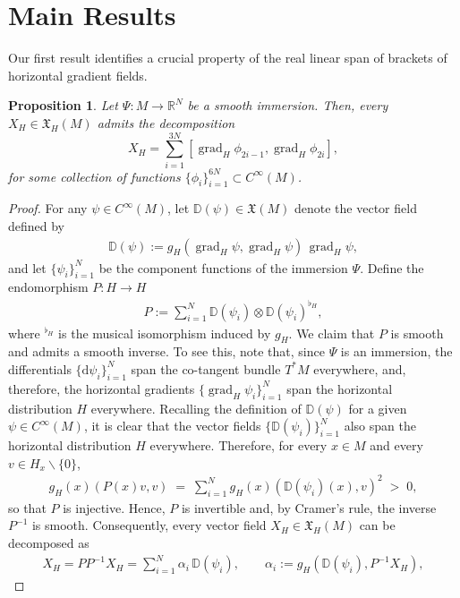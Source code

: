 \documentclass{article}
\newtheorem{proposition}[theorem]{Proposition}
\theoremstyle{remark}
\newcommand{\M}{M}
\newcommand{\Cinf}{C^{\infty}(\M)}
\newcommand{\XH}{\mathfrak{X}_H(\M)}
\DeclareMathOperator{\grad}{\mathrm{grad}}
\begin{document}
\section{Main Results}
%
Our first result identifies a crucial property of the real linear span of brackets of horizontal gradient fields.
%
\begin{proposition}\label{prop:bracket} Let $\Psi:\M\rightarrow\mathbb{R}^{N}$ be a smooth immersion. Then, every $X_H\in \XH$ admits the decomposition
%
$$
X_H = \sum_{i=1}^{3N} [\grad_H\phi_{2i-1}, \grad_H\phi_{2i}],
$$
%
for some collection of functions $\{\phi_i\}_{i=1}^{6N} \subset \Cinf$.
\end{proposition}

\begin{proof}
%
For any $\psi \in \Cinf$, let $\mathbb{D}(\psi)\in\mathfrak{X}(\M)$ denote the vector field defined by
%
\begin{align*}
    \mathbb{D}(\psi) := g_H(\grad_H \psi,\grad_H \psi)\, \grad_H\psi,
\end{align*}
%
and let $\{\psi_i\}_{i=1}^N$ be the component functions of the immersion $\Psi$. Define the endomorphism $P:H\rightarrow H$
%
\begin{align*}
    P:=\sum_{i=1}^{N} \mathbb{D}(\psi_i) \otimes \mathbb{D}(\psi_i)^{\flat_H},
\end{align*}
%
where $^{\flat_H}$ is the musical isomorphism induced by $g_H$. We claim that $P$ is smooth and admits a smooth inverse. To see this, note that, since $\Psi$ is an immersion, the differentials $\{\mathrm{d}\psi_i\}_{i=1}^{N}$ span the co-tangent bundle $T^{*}\M$ everywhere, and, therefore, the horizontal gradients $\{\grad_H\psi_i\}_{i=1}^{N}$ span the horizontal distribution $H$ everywhere. Recalling the definition of $\mathbb{D}(\psi)$ for a given $\psi\in\Cinf$, it is clear that the vector fields $\{\mathbb{D}(\psi_i)\}_{i=1}^{N}$ also span the horizontal distribution $H$ everywhere. Therefore, for
every $x\in\M$ and every $v\in H_x\backslash\{0\}$,
%
\begin{align*}
    g_H(x)(P(x)v,v) \;=\; \sum_{i=1}^{N} g_H(x)(\mathbb{D}(\psi_i)(x),v)^2
    \;>\; 0,
\end{align*}
%
so that $P$ is injective. Hence, $P$ is invertible and, by Cramer's rule, the inverse $P^{-1}$ is smooth. Consequently, every vector field $X_H \in \XH$ can be
decomposed as
%
\begin{align}\label{eq:wfields_decomp}
    X_H = PP^{-1}X_H=\sum_{i=1}^{N} \alpha_i\,\mathbb{D}(\psi_i),
    \qquad \alpha_i := g_H(\mathbb{D}(\psi_i),P^{-1}X_H),

\end{align}
\end{proof}
\end{document}
